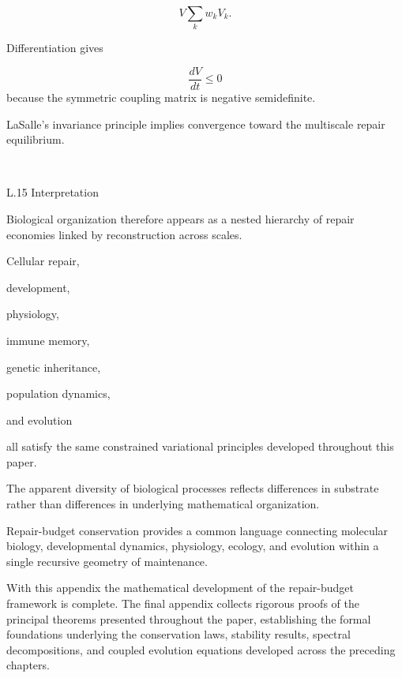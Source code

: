 \documentclass[12pt,oneside]{article}
\theoremstyle{plain}
\theoremstyle{definition}
\theoremstyle{remark}
\begin{document}
\[
V
\sum_k
w_kV_k.
\]

Differentiation gives

\[
\frac{dV}{dt}
\le0
\]
because the symmetric coupling matrix is negative semidefinite.

LaSalle's invariance principle implies convergence toward the multiscale repair equilibrium.

\square


L.15 Interpretation

Biological organization therefore appears as a nested hierarchy of repair economies linked by reconstruction across scales.

Cellular repair,

development,

physiology,

immune memory,

genetic inheritance,

population dynamics,

and evolution

all satisfy the same constrained variational principles developed throughout this paper.

The apparent diversity of biological processes reflects differences in substrate rather than differences in underlying mathematical organization.

Repair-budget conservation provides a common language connecting molecular biology, developmental dynamics, physiology, ecology, and evolution within a single recursive geometry of maintenance.

With this appendix the mathematical development of the repair-budget framework is complete. The final appendix collects rigorous proofs of the principal theorems presented throughout the paper, establishing the formal foundations underlying the conservation laws, stability results, spectral decompositions, and coupled evolution equations developed across the preceding chapters.

\newpage
\end{document}

